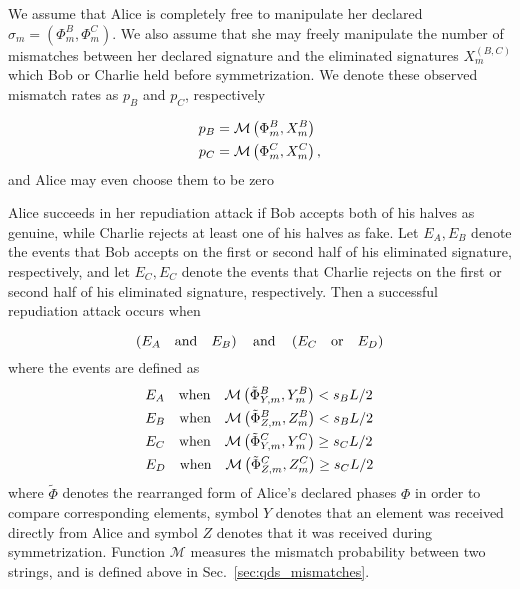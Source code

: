 We assume that Alice is completely free to manipulate her declared $\sigma_m = \left(\Phi_m^B, \Phi_m^C\right)$. We also assume that she may freely manipulate the number of mismatches %
between her declared signature and the eliminated signatures $X_m^{\left(B, C\right)}$ which Bob or Charlie held before symmetrization. We denote these observed mismatch rates as $p_B$ and $p_C$, respectively 

\begin{align}
p_B &= \mathcal{M}\left(\Phi_m^B, X_m^B\right) \notag \\
p_C &= \mathcal{M}\left(\Phi_m^C, X_m^C\right),
\end{align}
and Alice may even choose them to be zero


Alice succeeds in her repudiation attack if Bob accepts both of his halves as genuine, while Charlie rejects at least one of his halves as fake. Let $E_A, E_B$ denote the events that Bob accepts on the first or second half of his eliminated signature, respectively, and let $E_C, E_C$ denote the events that Charlie rejects on the first or second half of his eliminated signature, respectively. Then a successful repudiation attack occurs when

\begin{equation}
\left(E_A \qq{and} E_B \right) \qq{and} \left( E_C \qq{or} E_D\right) \notag
\end{equation}
where the events are defined as
\begin{align}\label{eqn:repudiation_events}
&E_A \qq{when} \mathcal{M}\left(\tilde{\Phi}_{Y, m}^B, Y_m^B\right) < s_B L/2  \notag \\
%
&E_B \qq{when} \mathcal{M}\left(\tilde{\Phi}_{Z, m}^B, Z_m ^B\right) < s_B L/2 \notag \\
%
&E_C \qq{when} \mathcal{M}\left(\tilde{\Phi}_{Y, m}^C, Y_m^C\right) \ge s_C L/2 \notag \\
%
&E_D \qq{when} \mathcal{M}\left(\tilde{\Phi}_{Z, m}^C, Z_m^C\right) \ge s_C L/2 
\end{align}
where $\tilde{\Phi}$ denotes the rearranged form of Alice's declared phases $\Phi$ in order to compare corresponding elements, symbol $Y$ denotes that an element was received directly from Alice and symbol $Z$ denotes that it was received during symmetrization. Function $\mathcal{M}$ measures the mismatch probability between two strings, and is defined above in Sec.~\ref{sec:qds_mismatches}.

